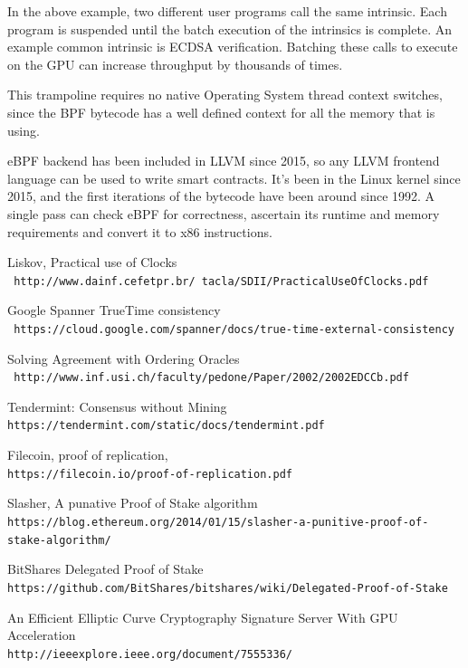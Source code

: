\documentclass[12pt]{article}
\begin{document}
In the above example, two different user programs call the same intrinsic. Each program is suspended until the batch execution of the intrinsics is complete. An example common intrinsic is ECDSA verification. Batching these calls to execute on the GPU can increase throughput by thousands of times.

This trampoline requires no native Operating System thread context switches, since the BPF bytecode has a well defined context for all the memory that is using.

eBPF backend has been included in LLVM since 2015, so any LLVM frontend language can be used to write smart contracts. It’s been in the Linux kernel since 2015, and the first iterations of the bytecode have been around since 1992. A single pass can check eBPF for correctness, ascertain its runtime and memory requirements and convert it to x86 instructions.




\begin{thebibliography}{9}
Liskov, Practical use of Clocks
\\\texttt{ http://www.dainf.cefetpr.br/~tacla/SDII/PracticalUseOfClocks.pdf}

Google Spanner TrueTime consistency
\\\texttt{ https://cloud.google.com/spanner/docs/true-time-external-consistency}

Solving Agreement with Ordering Oracles
\\\texttt{ http://www.inf.usi.ch/faculty/pedone/Paper/2002/2002EDCCb.pdf}

Tendermint: Consensus without Mining
\\\texttt{https://tendermint.com/static/docs/tendermint.pdf}

Filecoin, proof of replication,
\\\texttt{https://filecoin.io/proof-of-replication.pdf}

Slasher, A punative Proof of Stake algorithm
\\\texttt{https://blog.ethereum.org/2014/01/15/slasher-a-punitive-proof-of-stake-algorithm/}

BitShares Delegated Proof of Stake
\\\texttt{https://github.com/BitShares/bitshares/wiki/Delegated-Proof-of-Stake}

An Efficient Elliptic Curve Cryptography Signature Server With GPU Acceleration
\\\texttt{http://ieeexplore.ieee.org/document/7555336/}
\end{thebibliography}
\end{document}

